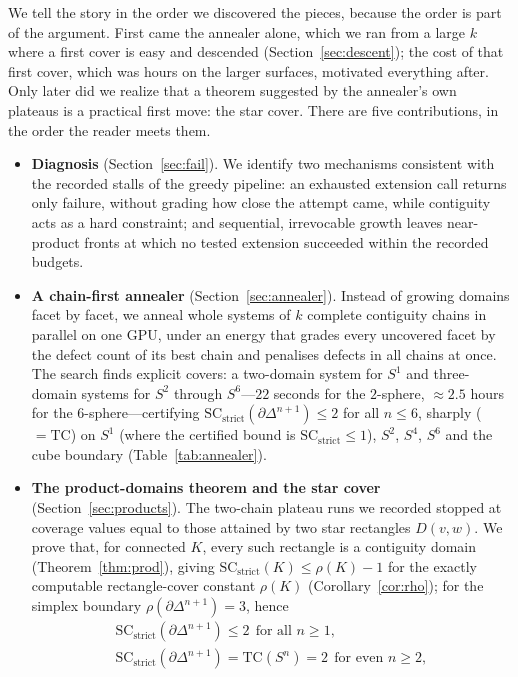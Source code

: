 \documentclass[12pt]{article}
\newcommand{\TC}{\mathrm{TC}}
\newcommand{\SC}{\mathrm{SC}}
\newcommand{\SCst}{\SC_{\mathrm{strict}}}
\begin{document}
\noindent We tell the story in the order we discovered the pieces,
because the order is part of the argument.  First came the annealer alone,
which we ran from a large $k$ where a first cover is easy and descended
(Section~\ref{sec:descent}); the cost of that first cover, which was
hours on the larger surfaces, motivated everything after.  Only later
did we realize that a theorem suggested by the annealer's own plateaus is
a practical first move: the star cover.  There are five contributions,
in the order the reader meets them.

\begin{itemize}
\item \textbf{Diagnosis} (Section~\ref{sec:fail}).  We identify two
mechanisms consistent with the recorded stalls of the greedy pipeline:
an exhausted extension call returns only failure, without grading how
close the attempt came, while contiguity acts as a hard constraint; and
sequential, irrevocable growth leaves near-product fronts at which no
tested extension succeeded within the recorded budgets.
\item \textbf{A chain-first annealer} (Section~\ref{sec:annealer}).
Instead of growing domains facet by facet, we anneal whole systems of
$k$ complete contiguity chains in parallel on one GPU, under an energy
that grades every uncovered facet by the defect count of its best
chain and penalises defects in all chains at once.  The search finds explicit covers:
a two-domain system for $S^1$ and three-domain systems for $S^2$ through $S^6$---$22$ seconds
for the $2$-sphere, ${\approx}2.5$ hours for the $6$-sphere---certifying
$\SCst(\partial\Delta^{n+1})\le2$ for all $n\le6$, sharply ($=\TC$) on
$S^1$ (where the certified bound is $\SCst\le1$), $S^2$, $S^4$, $S^6$ and the cube boundary (Table~\ref{tab:annealer}).
\item \textbf{The product-domains theorem and the star cover}
(Section~\ref{sec:products}).  The two-chain plateau runs we recorded
stopped at coverage values equal to those attained by two star
rectangles $D(v,w)$.  We prove that, for connected $K$, every such
rectangle is a contiguity domain (Theorem~\ref{thm:prod}), giving
$\SCst(K)\le\rho(K)-1$ for the exactly computable rectangle-cover
constant $\rho(K)$ (Corollary~\ref{cor:rho}); for the simplex boundary
$\rho(\partial\Delta^{n+1})=3$, hence
\begin{gather*}
\SCst(\partial\Delta^{n+1})\le 2\ \ \text{for all }n\ge1,\\
\SCst(\partial\Delta^{n+1})=\TC(S^n)=2\ \ \text{for even }n\ge2,

\end{gather*}
\end{itemize}
\end{document}
